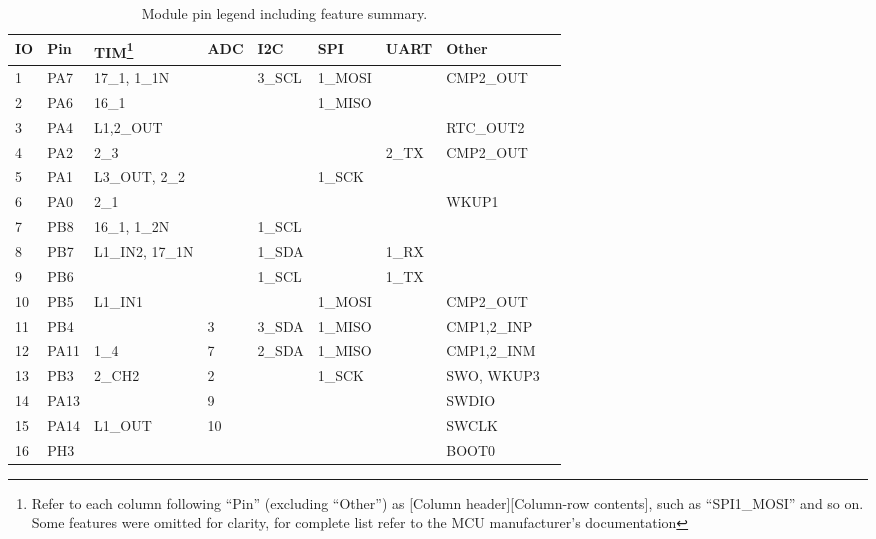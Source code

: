 \begin{table}[H]
\begin{center}
\caption{\label{table:module-pin-legend}Module pin legend including feature summary.}
    \begin{tabular}{|l|l|l|l|l|l|l|l|l|} \hline
    \textbf{IO} & \textbf{Pin} & \textbf{TIM\footnote{Refer to each column following ``Pin'' (excluding ``Other'') as [Column header][Column-row contents], such as ``SPI1\_MOSI'' and so on. Some features were omitted for clarity, for complete list refer to the MCU manufacturer's documentation}} & \textbf{ADC} & \textbf{I2C} & \textbf{SPI} & \textbf{UART} & \textbf{Other}\\ \hline
    1  & PA7  & 17\_1, 1\_1N    &     & 3\_SCL & 1\_MOSI &             & CMP2\_OUT          \\ \hline
    2  & PA6  & 16\_1          &     &       & 1\_MISO &             &                    \\ \hline
    3  & PA4  & L1,2\_OUT      &     &       &        &             & RTC\_OUT2           \\ \hline
    4  & PA2  & 2\_3           &     &       &        & 2\_TX      & CMP2\_OUT           \\ \hline
    5  & PA1  & L3\_OUT, 2\_2   &     &       & 1\_SCK  &             &                    \\ \hline
    6  & PA0  & 2\_1           &     &       &        &             & WKUP1   \\ \hline
    7  & PB8  & 16\_1, 1\_2N    &     & 1\_SCL &        &             &                    \\ \hline
    8  & PB7  & L1\_IN2, 17\_1N &     & 1\_SDA &        & 1\_RX        &                    \\ \hline
    9  & PB6  &               &     & 1\_SCL &        & 1\_TX        &                    \\ \hline
    10 & PB5  & L1\_IN1        &     &       & 1\_MOSI &             & CMP2\_OUT          \\ \hline
    11 & PB4  &               & 3   & 3\_SDA & 1\_MISO &             & CMP1,2\_INP        \\ \hline
    12 & PA11 & 1\_4           & 7   & 2\_SDA & 1\_MISO &             & CMP1,2\_INM        \\ \hline
    13 & PB3  & 2\_CH2         & 2   &       & 1\_SCK  &             & SWO, WKUP3 \\ \hline
    14 & PA13 &               & 9   &       &        &             & SWDIO            \\ \hline
    15 & PA14 & L1\_OUT        & 10  &       &        &             & SWCLK                   \\ \hline
    16 & PH3  &               &     &       &        &             & BOOT0                   \\ \hline
    \end{tabular}
\end{center}
\end{table}

